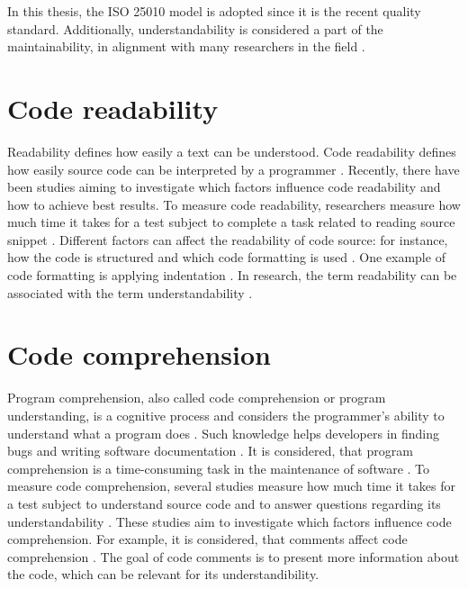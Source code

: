 In this thesis, the ISO 25010 model is adopted since it is the recent quality standard. Additionally, understandability is considered a part of the maintainability, in alignment with many researchers in the field \cite{xia2017measuring}. 



\section{Code readability}

Readability defines how easily a text can be understood. Code readability defines how easily source code can be interpreted by a programmer \cite{bakhuizen2019comments}.  Recently, there have been studies aiming to investigate which factors influence code readability and how to achieve best results. 
To measure code readability, researchers measure how much time it takes for a test subject to complete a task related to reading source snippet  \cite{bakhuizen2019comments}.   Different factors can affect the readability of code source: for instance, how the code is structured and which code formatting is used  \cite{bakhuizen2019comments}.  One example of code formatting is applying indentation \cite{buse2009learning}. In research, the term readability can be associated with the term understandability \cite{winkler2024investigating}.


\section{Code comprehension}

Program comprehension, also called code comprehension or program understanding, is a cognitive process and considers the programmer's ability to understand what a program does \cite{karahasanovic2007comprehension}. Such knowledge helps developers in finding bugs and writing software documentation \cite{xia2017measuring}.
It is considered, that program comprehension is a time-consuming task in the maintenance of software \cite{8075175}. To measure code comprehension, several studies measure how much time it takes for a test subject to understand source code and to answer questions regarding its understandability \cite{wagner2021code}. These studies aim to investigate which factors influence code comprehension. For example, it is considered, that comments affect code comprehension \cite{de2011comment}. The goal of code comments is to present more information about the code, which can be relevant for its understandibility.

